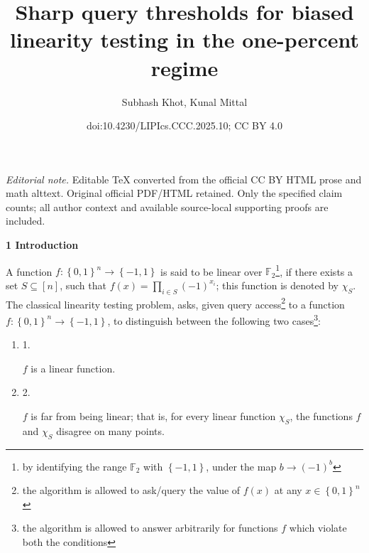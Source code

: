 \documentclass[10pt,a4paper]{article}
\title{Sharp query thresholds for biased linearity testing in the one-percent regime}
\author{Subhash Khot, Kunal Mittal}
\date{doi:10.4230/LIPIcs.CCC.2025.10; CC BY 4.0}
\begin{document}
\maketitle
\noindent\textit{Editorial note.} Editable TeX converted from the official CC BY HTML prose and math alttext. Original official PDF/HTML retained. Only the specified claim counts; all author context and available source-local supporting proofs are included.\par\medskip


\par\medskip\noindent\textbf{
1 Introduction}\par




A function $f:\left\{0,1\right\}^{n}\to\left\{-1,1\right\}$ is said to be linear over $\mathbb{F}_{2}$\footnote{by identifying the range $\mathbb{F}_{2}$ with $\left\{-1,1\right\}$, under the map $b\to(-1)^{b}$}, if there exists a set $S\subseteq[n]$, such that $f(x)=\prod_{i\in S}\left(-1\right)^{x_{i}}$; this function is denoted by $\chi_{S}$.
The classical linearity testing problem, asks, given query access\footnote{the algorithm is allowed to ask/query the value of $f(x)$ at any $x\in\left\{0,1\right\}^{n}$} to a function $f:\left\{0,1\right\}^{n}\to\left\{-1,1\right\}$, to distinguish between the following two cases\footnote{the algorithm is allowed to answer arbitrarily for functions $f$ which violate both the conditions}:\par


\begin{enumerate}


\item[] 
1. 


$f$ is a linear function.\par





\item[] 
2. 


$f$ is far from being linear; that is, for every linear function $\chi_{S}$, the functions $f$ and $\chi_{S}$ disagree on many points.\par





\end{enumerate}
\end{document}
